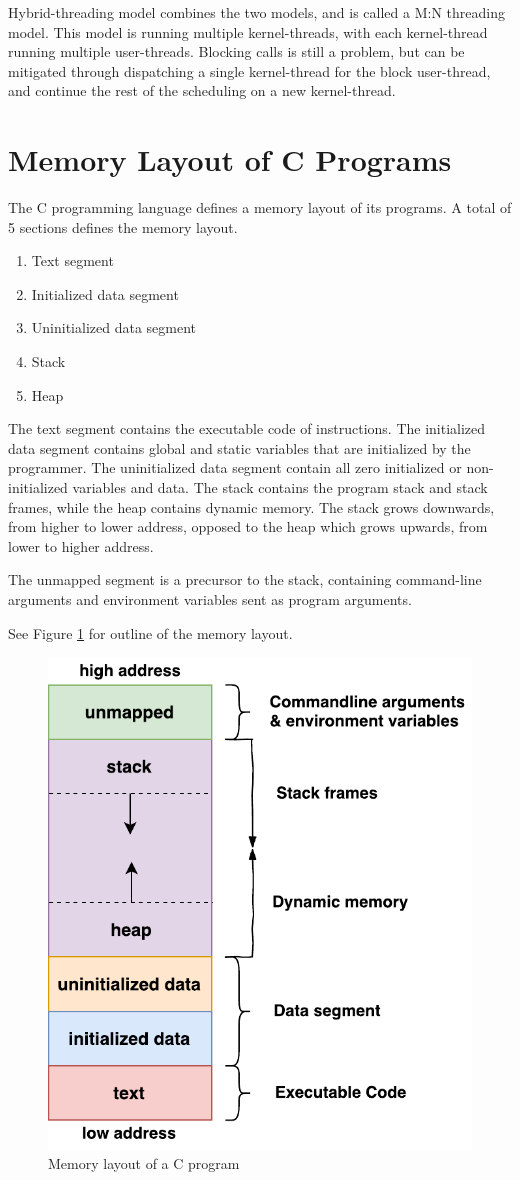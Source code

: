 Hybrid-threading model combines the two models, and is called a M:N threading model. This model is running multiple kernel-threads, with each kernel-thread running multiple user-threads. Blocking calls is still a problem, but can be mitigated through dispatching a single kernel-thread for the block user-thread, and continue the rest of the scheduling on a new kernel-thread. 


\section{Memory Layout of C Programs}
\label{sec:memory_layout_c}

\FloatBarrier

The C programming language defines a memory layout of its programs. A total of 5 sections defines the memory layout.

\begin{enumerate}[topsep=0em,itemsep=-1em,partopsep=0.5em,parsep=1em]
    \item Text segment
    \item Initialized data segment
    \item Uninitialized data segment
    \item Stack
    \item Heap
\end{enumerate}

The text segment contains the executable code of instructions. The initialized data segment contains global and static variables that are initialized by the programmer. The uninitialized data segment contain all zero initialized or non\hyp{}initialized variables and data. The stack contains the program stack and stack frames, while the heap contains dynamic memory. The stack grows downwards, from higher to lower address, opposed to the heap which grows upwards, from lower to higher address. 

The unmapped segment is a precursor to the stack, containing command-line arguments and environment variables sent as program arguments. 

See Figure \ref{fig:c_memory_layout} for outline of the memory layout.

\begin{figure}[h!]
    \centering
    \includegraphics[width=0.5\linewidth]{fig/c_memory_layout}
    \caption{Memory layout of a C program}
    \label{fig:c_memory_layout}
\end{figure}

